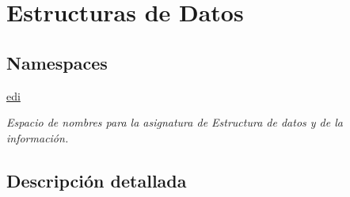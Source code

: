 \hypertarget{group__edi}{\section{Estructuras de Datos}
\label{group__edi}
}
\subsection*{Namespaces}
\begin{DoxyCompactItemize}
\item 
 \hyperlink{namespaceedi}{edi}
\begin{DoxyCompactList}\small\item\em Espacio de nombres para la asignatura de Estructura de datos y de la información. \end{DoxyCompactList}\end{DoxyCompactItemize}


\subsection{Descripción detallada}
